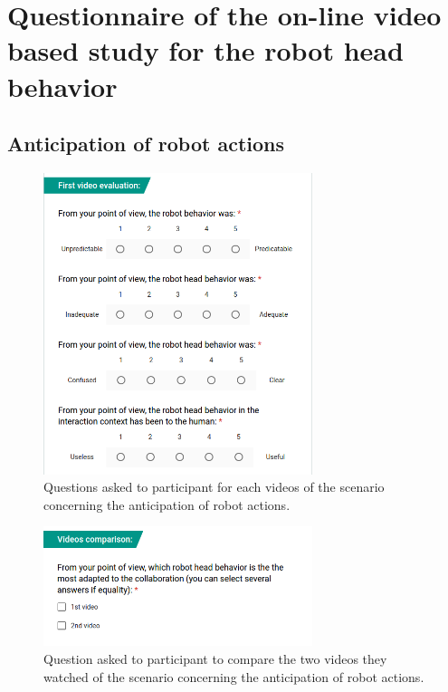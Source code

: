 \chapter{Questionnaire of the on-line video based study for the robot head behavior}
\label{chap:annexe2}

\section{Anticipation of robot actions}

\begin{figure}[!h]
	\centering
    \includegraphics[width=0.7\textwidth]{figs/Chapter6/QuestionsSce1.png}
    \caption{Questions asked to participant for each videos of the scenario concerning the anticipation of robot actions.}
    \label{fig:headArchi}
\end{figure}

\begin{figure}[!h]
	\centering
    \includegraphics[width=0.7\textwidth]{figs/Chapter6/ComparaisonSce1.png}
    \caption{Question asked to participant to compare the two videos they watched of the scenario concerning the anticipation of robot actions.}
    \label{fig:headArchi}
\end{figure}

